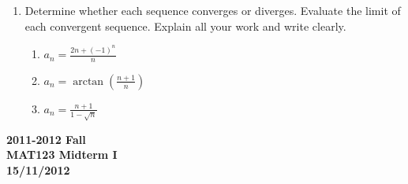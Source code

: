 \documentclass[a4paper, 12pt]{article}
\begin{document}
\begin{enumerate}[leftmargin=*,label=\textbf{\arabic*.}]
\item Determine whether each sequence converges or diverges. Evaluate the limit of each convergent sequence. Explain all your work and write clearly.

\begin{enumerate}[leftmargin=*,label=\textbf{\alph*.}]
\item $\displaystyle a_n=\frac{2n+(-1)^n}n$
\item $\displaystyle a_n=\arctan\left(\frac{n+1}n\right)$
\item $\displaystyle a_n = \frac{n+1}{1-\sqrt n}$
\end{enumerate}
\end{enumerate}

\newpage
{}
{}

\begin{center}
\textbf{2011-2012 Fall\\MAT123 Midterm I\\15/11/2012}
\end{center}
\end{document}
